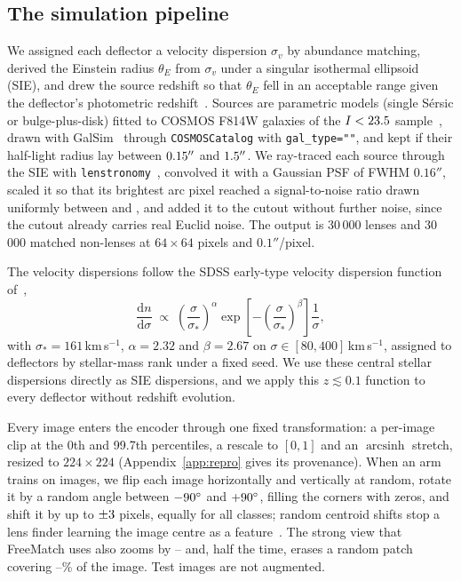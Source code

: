 \subsection{The simulation pipeline}
\label{sec:sim-pipeline}

We assigned each deflector a velocity dispersion $\sigma_v$ by abundance matching, derived
the Einstein radius $\theta_E$ from $\sigma_v$ under a singular isothermal ellipsoid (SIE),
and drew the source redshift so that $\theta_E$ fell in an acceptable range given the
deflector's photometric redshift~\citep{euclidq1phz}. Sources are parametric models (single
S\'ersic or bulge-plus-disk) fitted to COSMOS F814W galaxies of the $I < 23.5$
sample~\citep{mandelbaum2014great3}, drawn with GalSim~\citep{rowe2015galsim} through
\texttt{COSMOSCatalog} with \texttt{gal\_type="\simSourceGalType"}, and kept if their
half-light radius lay between $0.15''$ and $1.5''$. We ray-traced each
source through the SIE with \texttt{lenstronomy}~\citep{birrer2018lenstronomy,
birrer2021lenstronomy}, convolved it with a Gaussian PSF of FWHM $0.16''$, scaled it so that
its brightest arc pixel reached a signal-to-noise ratio drawn uniformly between
\simArcSnrMin{} and \simArcSnrMax{}, and added it to the cutout without further noise, since
the cutout already carries real Euclid noise. The output
is 30\,000 lenses and 30\,000 matched non-lenses at $64 \times 64$ pixels and $0.1''$/pixel.

The velocity dispersions follow the SDSS early-type velocity dispersion function
of~\citet{choi2007vdf},
\begin{equation}
  \frac{\mathrm{d}n}{\mathrm{d}\sigma} \;\propto\;
  \left(\frac{\sigma}{\sigma_*}\right)^{\alpha}
  \exp\!\left[-\left(\frac{\sigma}{\sigma_*}\right)^{\beta}\right] \frac{1}{\sigma},
  \label{eq:vdf}
\end{equation}
with $\sigma_* = 161$\,km\,s$^{-1}$, $\alpha = 2.32$ and $\beta = 2.67$ on
$\sigma \in [80, 400]$\,km\,s$^{-1}$, assigned to deflectors by stellar-mass rank under a
fixed seed. We use these central stellar dispersions directly as SIE dispersions, and we apply
this $z \lesssim 0.1$ function to every deflector without redshift evolution.

Every image enters the encoder through one fixed transformation: a per-image clip at the 0th
and 99.7th percentiles, a rescale to $[0,1]$ and an $\operatorname{arcsinh}$ stretch, resized
to $224 \times 224$ (Appendix~\ref{app:repro} gives its provenance). When an arm trains on
images, we flip each image horizontally and vertically at random, rotate it by a random angle
between $-90{}^\circ$ and $+90{}^\circ$, filling the corners with zeros, and
shift it by up to $\pm 3{}$ pixels, equally for all classes; random centroid shifts
stop a lens finder learning the image centre as a feature~\citep{holismokesXI}. The strong
view that FreeMatch uses also zooms by \augZoomLo{}--\augZoomHi{} and, half the time, erases a
random patch covering \augEraseLoPct{}--\augEraseHiPct{}\% of the image. Test images are not
augmented.

